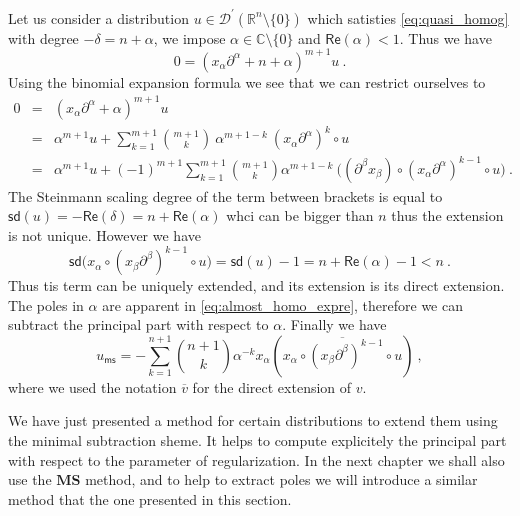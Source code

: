 \documentclass[11pt]{book}
\newcommand{\ms}{\mathsf{ms}}
\newcommand{\sd}{\mathsf{sd}}
\renewcommand{\Re}{\mathsf{Re}}
\newcommand{\MS}{\textbf{MS}}
\newcommand{\Dcal}{\mathcal{D}}
\newcommand{\Cbb}{\mathbb{C}}
\newcommand{\Rbb}{\mathbb{R}}
\theoremstyle{break}
\begin{document}
Let us consider a distribution $u \in \Dcal^\prime(\Rbb^n\setminus\{0\})$ which satisties \eqref{eq:quasi_homog} with degree $-\delta = n + \alpha$, we impose $\alpha\in\Cbb\setminus\{0\}$ and $\Re(\alpha)<1$. Thus we have
%
\begin{equation*}
0 = \left( x_\alpha \partial^\alpha + n + \alpha \right)^{m+1} u \ .
\end{equation*}
%
Using the binomial expansion formula we see that we can restrict ourselves to 
%
\begin{eqnarray}
0 &=&\left(x_\alpha \partial^\alpha + \alpha \right)^{m+1} u \nonumber \\
&=& \alpha^{m+1} u + \sum_{k=1}^{m+1} \binom{m+1}{k} \ \alpha^{m+1-k} \ \left(x_\alpha \partial^\alpha \right)^{k} \circ u \nonumber \\
&=& \alpha^{m+1} u + (-1)^{m+1} \sum_{k=1}^{m+1} \binom{m+1}{k} \alpha^{m+1-k} \ \bigg( \left(\partial^\beta x_\beta \right) \circ \left(x_\alpha \partial^\alpha \right)^{k-1} \circ u \bigg) \ .
\label{eq:almost_homo_expre}
\end{eqnarray}
%
The Steinmann scaling degree of the term between brackets is equal to $\sd(u) = - \Re(\delta)=n+\Re(\alpha)$ whci can be bigger than $n$ thus the extension is not unique. However we have
%
\begin{equation*}
\sd\bigg(x_\alpha \circ \left(x_\beta \partial^\beta \right)^{k-1} \circ u\bigg) = \sd(u) - 1 = n + \Re(\alpha) - 1 < n \ .
\end{equation*}
%
Thus tis term can be uniquely extended, and its extension is its direct extension. The poles in $\alpha$ are apparent in \eqref{eq:almost_homo_expre}, therefore we can subtract the principal part with respect to $\alpha$. Finally we have
%
\begin{equation*}
u_\ms = - \sum_{k=1}^{n+1} \binom{n+1}{k} \alpha^{-k} x_\alpha \left( \overline{ x_\alpha \circ \left(x_\beta \partial^\beta \right)^{k-1} \circ u } \right) \ , 
\end{equation*}
%
where we used the notation $\overline{v}$ for the direct extension of $v$.


\bigskip


We have just presented a method for certain distributions to extend them using the minimal subtraction sheme. It helps to compute explicitely the principal part with respect to the parameter of regularization. In the next chapter we shall also use the $\MS$ method, and to help to extract poles we will introduce a similar method that the one presented in this section.
\end{document}
